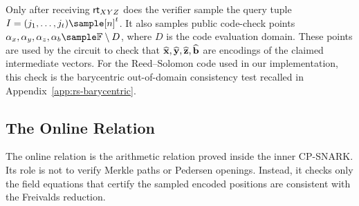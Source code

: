 
Only after receiving \(\textsf{rt}_{XYZ}\)   does the verifier sample the query tuple
{\footnotesize \(I=(j_1,\ldots,j_t)\sample [n]^t\).}
It also samples public code-check points
{\footnotesize
\(\alpha_x,\alpha_y,\alpha_z, \revmath{\alpha_b}\sample\mathbb{F}\setminus D\),
}
where \(D\) is the
code evaluation domain. These points are used by the circuit to check that
{\footnotesize
\(\widehat{\mathbf{x}},\widehat{\mathbf{y}},\widehat{\mathbf{z}}, \widehat{\mathbf{b}}\)
}
are encodings of
the claimed intermediate vectors. For the Reed--Solomon code used in our
implementation, this check is the barycentric out-of-domain consistency test
recalled in Appendix~\ref{app:rs-barycentric}.

\subsection{The Online Relation}
\label{sec:snark-relation}
The online relation is the arithmetic relation proved inside the
inner CP-SNARK.  Its role is not to verify Merkle paths or Pedersen openings.
Instead, it checks only the field equations that certify the sampled encoded
positions are consistent with the Freivalds reduction.

